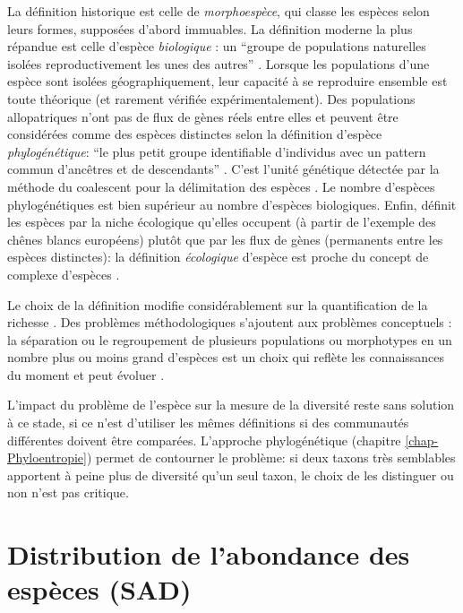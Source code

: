 \documentclass[
  11pt,
  american,
  a4paper,
  extrafontsizes,onecolumn,openright
  ]{memoir}
\begin{document}
La définition historique est celle de \emph{morphoespèce}, qui classe les espèces selon leurs formes, supposées d'abord immuables.
La définition moderne la plus répandue est celle d'espèce \emph{biologique} \autocite{Dobzhansky1937}: un \enquote{groupe de populations naturelles isolées reproductivement les unes des autres} \autocite{Mayr1942}.
Lorsque les populations d'une espèce sont isolées géographiquement, leur capacité à se reproduire ensemble est toute théorique (et rarement vérifiée expérimentalement).
Des populations allopatriques n'ont pas de flux de gènes réels entre elles et peuvent être considérées comme des espèces distinctes selon la définition d'espèce \emph{phylogénétique}: \enquote{le plus petit groupe identifiable d'individus avec un pattern commun d'ancêtres et de descendants} \autocite{Cracraft1983}.
C'est l'unité génétique détectée par la méthode du coalescent pour la délimitation des espèces \autocite{Sukumaran2017}.
Le nombre d'espèces phylogénétiques est bien supérieur au nombre d'espèces biologiques.
Enfin, \textcite{VanValen1976} définit les espèces par la niche écologique qu'elles occupent (à partir de l'exemple des chênes blancs européens) plutôt que par les flux de gènes (permanents entre les espèces distinctes): la définition \emph{écologique} d'espèce est proche du concept de complexe d'espèces \autocite[ensemble d'espèces voisines échangeant des gènes,][]{Pernes1984}.

Le choix de la définition modifie considérablement sur la quantification de la richesse \autocite{Agapow2004}.
Des problèmes méthodologiques s'ajoutent aux problèmes conceptuels \autocite{Hey2001}: la séparation ou le regroupement de plusieurs populations ou morphotypes en un nombre plus ou moins grand d'espèces est un choix qui reflète les connaissances du moment et peut évoluer \autocite{Barberousse2014}.

L'impact du problème de l'espèce sur la mesure de la diversité reste sans solution à ce stade, si ce n'est d'utiliser les mêmes définitions si des communautés différentes doivent être comparées.
L'approche phylogénétique (chapitre \ref{chap-Phyloentropie}) permet de contourner le problème: si deux taxons très semblables apportent à peine plus de diversité qu'un seul taxon, le choix de les distinguer ou non n'est pas critique.

\chapter{Distribution de l'abondance des espèces (SAD)}\label{sec-SAD}
\end{document}
